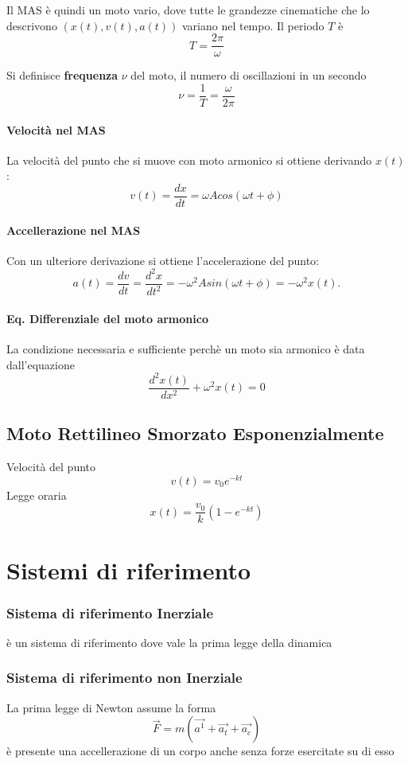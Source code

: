 \documentclass[a4paper]{report}
\begin{document}
    Il MAS è quindi un moto vario, dove tutte le grandezze cinematiche che lo descrivono $(x(t), v(t), a(t))$ variano nel tempo.
    Il periodo $T$ è
    \[ T = \frac{2\pi}{\omega} \]

    Si definisce \textbf{frequenza} $\nu$ del moto, il numero di oscillazioni in un secondo
    \[ \nu = \frac{1}{T}=\frac{\omega}{2\pi} \]
  \subsubsection{Velocità nel MAS}
  La velocità del punto che si muove con moto armonico si ottiene derivando $x(t)$:
  \[ v(t)=\frac{dx}{dt} = \omega A cos(\omega t + \phi) \]
  \subsubsection{Accellerazione nel MAS}
  Con un ulteriore derivazione si ottiene l'accelerazione del punto:
  \[ a(t)=\frac{dv}{dt}=\frac{d^2 x}{dt^2} = -\omega^2 A sin(\omega t + \phi) = -\omega^2 x(t). \]
  \subsubsection{Eq. Differenziale del moto armonico}
  La condizione necessaria e sufficiente perchè un moto sia armonico è data dall'equazione
  \[ \frac{d^2 x(t)}{dx^2} + \omega^2 x(t) = 0 \]

  \section{Moto Rettilineo Smorzato Esponenzialmente}
  Velocità del punto
  \[ v(t) = v_0 e^{-kt} \]
  Legge oraria
  \[ x(t) = \frac{v_0}{k} (1-e^{-kt}) \]

  \chapter{Sistemi di riferimento}
  \subsection{Sistema di riferimento Inerziale}
  è un sistema di riferimento dove vale la prima legge della dinamica
  \subsection{Sistema di riferimento non Inerziale}
  La prima legge di Newton assume la forma
  \[ \vec{F} = m(\vec{a^1} + \vec{a_t} + \vec{a_c}) \]
  è presente una accellerazione di un corpo anche senza forze esercitate su di esso
\end{document}
